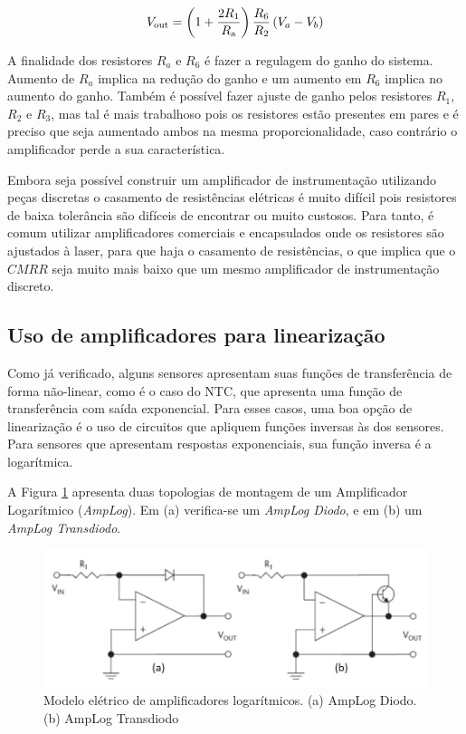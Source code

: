 \documentclass[a4paper]{instrumentacao}
\begin{document}
\begin{equation}
	V_\mathrm{out} = \left (1 + {2 R_1 \over R_\mathrm{a}} \right ) {R_6 \over R_2} \left(V_a - V_b\right)
	\label{eq:amplificador-de-instrumentacao}
\end{equation}

A finalidade dos resistores $R_a$ e $R_6$ é fazer a regulagem do ganho do sistema. Aumento de $R_a$ implica na redução do ganho e um aumento em $R_6$ implica no aumento do ganho. Também é possível fazer ajuste de ganho pelos resistores $R_1$, $R_2$ e $R_3$, mas tal é mais trabalhoso pois os resistores estão presentes em pares e é preciso que seja aumentado ambos na mesma proporcionalidade, caso contrário o amplificador perde a sua característica.

Embora seja possível construir um amplificador de instrumentação utilizando peças discretas o casamento de resistências elétricas é muito difícil pois resistores de baixa tolerância são difíceis de encontrar ou muito custosos. Para tanto, é comum utilizar amplificadores comerciais e encapsulados onde os resistores são ajustados à laser\cite{wikipedia-ia}, para que haja o casamento de resistências, o que implica que o $CMRR$ seja muito mais baixo que um mesmo amplificador de instrumentação discreto.

\subsection{Uso de amplificadores para linearização}

Como já verificado, alguns sensores apresentam suas funções de transferência de forma não-linear, como é o caso do NTC, que apresenta uma função de transferência com saída exponencial. Para esses casos, uma boa opção de linearização é o uso de circuitos que apliquem funções inversas às dos sensores. Para sensores que apresentam respostas exponenciais, sua função inversa é a logarítmica.

A Figura \ref{fig:amplificador-logaritmico} apresenta duas topologias de montagem de um Amplificador Logarítmico (\textit{AmpLog}). Em (a) verifica-se um \textit{AmpLog Diodo}, e em (b) um \textit{AmpLog Transdiodo}. 

\begin{figure}[H]
\center
\includegraphics[width=\textwidth]{amp_log.jpg}
\caption{Modelo elétrico de amplificadores logarítmicos. (a) AmpLog Diodo. (b) AmpLog Transdiodo}
\label{fig:amplificador-logaritmico}
\end{figure}
\end{document}
